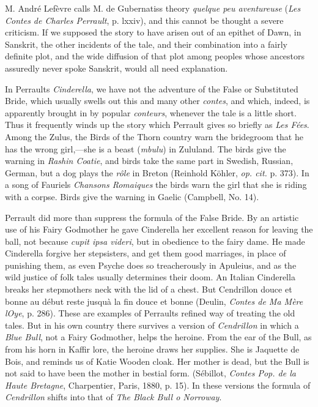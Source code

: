 \documentclass[14pt,a4paper]{memoir}
\begin{document}
{M. André Lefèvre calls M. de Gubernatis\textquotesingle s theory
\emph{quelque peu aventureuse} (\emph{Les Contes de Charles Perrault},
p. lxxiv), and this cannot be thought a severe criticism. If we supposed
the story to have arisen out of an epithet of Dawn, in Sanskrit, the
other incidents of the tale, and their combination into a fairly
definite plot, and the wide diffusion of that plot among peoples whose
ancestors assuredly never spoke Sanskrit, would all need explanation.

In Perrault\textquotesingle s \emph{Cinderella}, we have not the
adventure of the False or Substituted Bride, which usually swells out
this and many other \emph{contes}, and which, indeed, is apparently
brought in by popular \emph{conteurs}, whenever the tale is a little
short. Thus it frequently winds up the story which Perrault gives so
briefly as \emph{Les Fées}. Among the
Zulus,
the Birds of the Thorn country warn the bridegroom that he has the wrong
girl,---she is a beast (\emph{mbulu}) in Zululand. The birds give the
warning in \emph{Rashin
Coatie},
and birds take the same part in Swedish, Russian, German, but a dog
plays the \emph{rôle} in Breton (Reinhold Köhler, \emph{op. cit.} p.
373). In a song of Fauriel\textquotesingle s \emph{Chansons Romaiques}
the birds warn the girl that she is riding with a corpse. Birds give the
warning in Gaelic (Campbell, No. 14).

Perrault did more than suppress the formula of the False Bride. By an
artistic use of his Fairy Godmother he gave Cinderella her excellent
reason for leaving the ball, not because \emph{cupit ipsa videri}, but
in obedience to the fairy dame. He made Cinderella forgive her
stepsisters, and get them good marriages, in place of punishing them, as
even Psyche does so treacherously in Apuleius, and as the wild justice
of folk tales usually determines their doom. An Italian Cinderella
breaks her stepmother\textquotesingle s neck with the lid of a chest.
But Cendrillon \textquotesingle douce et bonne au début reste
jusqu\textquotesingle à la fin douce et bonne\textquotesingle{} (Deulin,
\emph{Contes de Ma Mère l\textquotesingle Oye}, p. 286). These are
examples of Perrault\textquotesingle s refined way of treating the old
tales. But in his own country there survives a version of
\emph{Cendrillon} in which a \emph{Blue Bull}, not a Fairy Godmother,
helps the heroine. From the ear of the Bull, as from his horn in Kaffir
lore, the heroine draws her supplies. She is Jaquette de Bois, and
reminds us of Katie Wooden cloak. Her mother is dead, but the Bull is
not said to have been the mother in bestial form. (Sébillot,
\emph{Contes Pop. de la Haute Bretagne}, Charpentier, Paris, 1880, p.
15). In these versions the formula of \emph{Cendrillon} shifts into that
of \emph{The Black Bull o\textquotesingle{} Norroway}.

}
\end{document}
